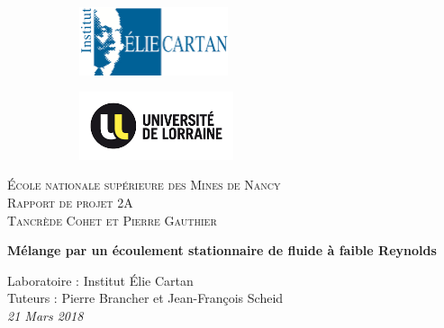\documentclass[a4paper,12pt,titlepage]{report}
\begin{document}
\begin{titlepage}
 
	\begin{center}
	\begin{figure}[!h]
	\centering	
		\begin{subfigure}[b]{0.3\textwidth}
		\end{subfigure}
		\begin{subfigure}[b]{0.3\textwidth}
		\includegraphics[height = 2cm, keepaspectratio]{graphes/elie_cartan.png}
		\end{subfigure}
		\begin{subfigure}[b]{0.3\textwidth}
		\includegraphics[height = 2cm, keepaspectratio]{graphes/univ_lorraine.png}
	\end{subfigure}
	\end{figure}
 
	\textsc{École nationale supérieure des Mines de Nancy}\\[2cm]
	\textsc{Rapport de projet 2A}\\[1cm]
	\textsc{Tancrède Cohet et Pierre Gauthier}\\[1cm]
 
	\begin{doublespace}
		{ \huge \bfseries{Mélange par un écoulement stationnaire de fluide à faible 				Reynolds}}\\[2cm]
	\end{doublespace}
	\textmd{Laboratoire : Institut Élie Cartan}\\[1cm]
	\textmd{Tuteurs : Pierre Brancher et Jean-François Scheid }\\[1cm]
 
	\vfill
	{\textit{{\large 21 Mars 2018}}}
 
	\end{center}
\end{titlepage}
\end{document}
